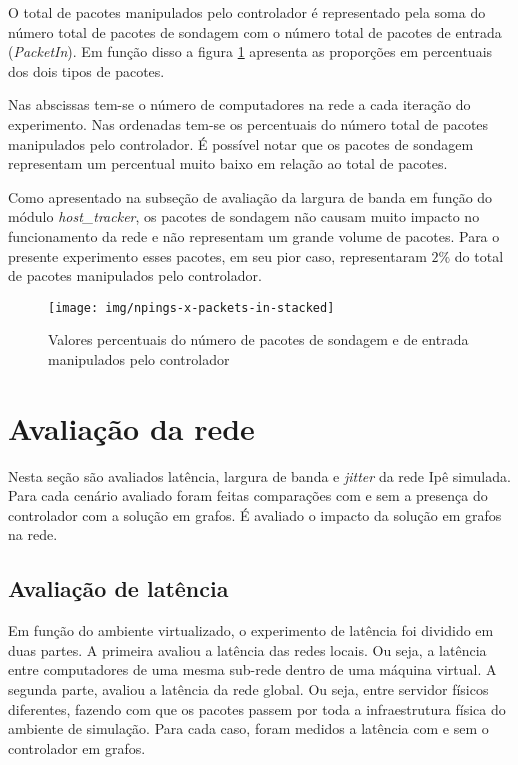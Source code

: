 O total de pacotes manipulados pelo controlador é representado pela soma 
do número total de pacotes de sondagem com o número total de pacotes de 
entrada (\emph{PacketIn}).
Em função disso a figura \ref{fig:npings-x-packets-in-stacked} apresenta 
as proporções em percentuais dos dois tipos de pacotes.

Nas abscissas tem-se o número de computadores na rede a cada iteração do 
experimento.
Nas ordenadas tem-se os percentuais do número total de pacotes manipulados 
pelo controlador.
É possível notar que os pacotes de sondagem representam um percentual muito 
baixo em relação ao total de pacotes.

Como apresentado na subseção de avaliação da largura de banda em função do 
módulo \emph{host\_tracker}, os pacotes de sondagem não causam muito impacto 
no funcionamento da rede e não representam um grande volume de pacotes.
Para o presente experimento esses pacotes, em seu pior caso, representaram
$2\%$ do total de pacotes manipulados pelo controlador.

\begin{figure}[!htb]
    \centering
    \label{fig:npings-x-packets-in-stacked}
    \texttt{[image: img/npings-x-packets-in-stacked]}
    \caption{Valores percentuais do número de pacotes de sondagem e de 
        entrada manipulados pelo controlador}
\end{figure}

\section{Avaliação da rede}

Nesta seção são avaliados latência, largura de banda e \emph{jitter} da 
rede Ipê simulada.
Para cada cenário avaliado foram feitas comparações com e sem a presença 
do controlador com a solução em grafos. 
É avaliado o impacto da solução em grafos na rede.

\subsection{Avaliação de latência}

Em função do ambiente virtualizado, o experimento de latência foi dividido em 
duas partes.
A primeira avaliou a latência das redes locais.
Ou seja, a latência entre computadores de uma mesma sub-rede dentro de uma 
máquina virtual.
A segunda parte, avaliou a latência da rede global.
Ou seja, entre servidor físicos diferentes, fazendo com que os pacotes 
passem por toda a infraestrutura física do ambiente de simulação.
Para cada caso, foram medidos a latência com e sem o controlador em grafos.

